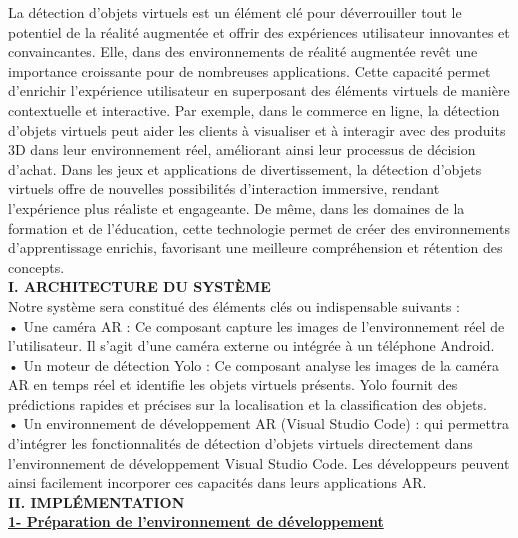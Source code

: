 \documentclass[a4paper, 13px]{article}
\begin{document}
La détection d'objets virtuels est un élément clé pour déverrouiller tout le potentiel de la réalité augmentée et offrir des expériences utilisateur innovantes et convaincantes. Elle, dans des environnements de réalité augmentée revêt une importance croissante pour de nombreuses applications. Cette capacité permet d'enrichir l'expérience utilisateur en superposant des éléments virtuels de manière contextuelle et interactive. Par exemple, dans le commerce en ligne, la détection d'objets virtuels peut aider les clients à visualiser et à interagir avec des produits 3D dans leur environnement réel, améliorant ainsi leur processus de décision d'achat. Dans les jeux et applications de divertissement, la détection d'objets virtuels offre de nouvelles possibilités d'interaction immersive, rendant l'expérience plus réaliste et engageante. De même, dans les domaines de la formation et de l'éducation, cette technologie permet de créer des environnements d'apprentissage enrichis, favorisant une meilleure compréhension et rétention des concepts. \\


{\bfseries \MakeUppercase{I. Architecture du système  }} \\

Notre système sera constitué des éléments clés ou indispensable suivants : \\

•	Une caméra AR : Ce composant capture les images de l'environnement réel de l'utilisateur. Il s'agit d'une caméra externe ou intégrée à un téléphone Android. \\

•	Un moteur de détection Yolo : Ce composant analyse les images de la caméra AR en temps réel et identifie les objets virtuels présents. Yolo fournit des prédictions rapides et précises sur la localisation et la classification des objets.\\

•	Un environnement de développement AR (Visual Studio Code) : qui permettra d'intégrer les fonctionnalités de détection d'objets virtuels directement dans l'environnement de développement Visual Studio Code. Les développeurs peuvent ainsi facilement incorporer ces capacités dans leurs applications AR.\\


{\bfseries \MakeUppercase{II. Implémentation}}\\

{\bfseries \underline{1-	Préparation de l'environnement de développement}}\\
\end{document}
